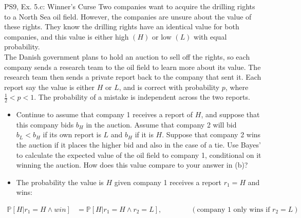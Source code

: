 \begin{frame}{PS9, Ex. 5.c: Winner's Curse}
      Two companies want to acquire the drilling rights to a North Sea oil field. However, the companies are unsure about the value of these rights. They know the drilling rights have an identical value for both companies, and this value is either high $(H)$ or low $(L)$ with equal probability.\\\smallskip
      The Danish government plans to hold an auction to sell off the rights, so each company sends a research team to the oil field to learn more about its value. The research team then sends a private report back to the company that sent it. Each report say the value is either $H$ or $L$, and is correct with probability $p$, where $\frac{1}{2} < p < 1$. The probability of a mistake is independent across the two reports.
      \vspace{-2pt}
      \begin{itemize}
        \item[(c)] Continue to assume that company 1 receives a report of $H$, and suppose that this company bids $b_H$ in the auction. Assume that company 2 will bid $b_L < b_H$ if its own report is $L$ and $b_H$ if it is $H$. Suppose that company 2 wins the auction if it places the higher bid and also in the case of a tie. Use Bayes’ to calculate the expected value of the oil field to company 1, conditional on it winning the auction. How does this value compare to your answer in (b)?
        \item[Step 1:] The probability the value is $H$ given company 1 receives a report $r_1=H$ and wins:
        \end{itemize}
        \vspace{-8pt}
        \begin{align*}
          \mathbb{P}[H|r_1=H\wedge win]&=\mathbb{P}[H|r_1=H\wedge r_2=L],\quad\quad\quad\quad(\text{company 1 only wins if }r_2=L)
        \end{align*}
      \vfill\null
\end{frame}
